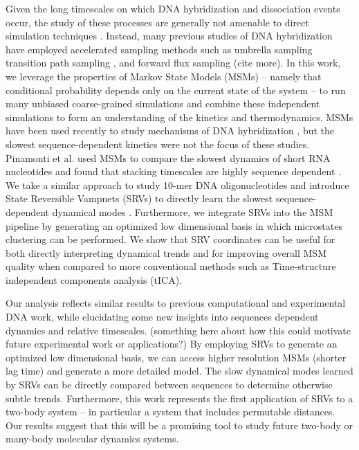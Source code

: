 \documentclass[journal=jpcbfk,manuscript=article]{achemso}
\begin{document}
Given the long timescales on which DNA hybridization and dissociation events occur, the study of these processes are generally not amenable to direct simulation techniques \citep{Phys2014}. Instead, many previous studies of DNA hybridization have employed accelerated sampling methods such as umbrella sampling \citep{Schmitt2013ExploringSurface} transition path sampling \citep{Sambriski2009}, \citep{Hoefert2011MolecularOligonucleotides}  and forward flux sampling  \citep{Phys2014} (cite more). In this work, we leverage the properties of Markov State Models (MSMs) -- namely that conditional probability depends only on the current state of the system \citep{Pande2010EverythingAsk}--  to run many unbiased coarse-grained simulations and combine these independent simulations to form an understanding of the kinetics and thermodynamics. MSMs have been used recently to study mechanisms of DNA hybridization  \citep{Jin2019} \citep{Xiao2019}, but the slowest sequence-dependent kinetics were not the focus of these studies. Pinamonti et al. used MSMs to compare the slowest dynamics of short RNA nucleotides and found that stacking timescales are highly sequence dependent \citep{Pinamonti2017}. We take a similar approach to study 10-mer DNA oligonucleotides and introduce State Reversible Vampnets (SRVs) to directly learn the slowest sequence-dependent dynamical modes \citep{Chen}. Furthermore, we integrate SRVs into the MSM pipeline by generating an optimized low dimensional basis in which microstates clustering can be performed. We show that SRV coordinates can be useful for both directly interpreting dynamical trends and for improving overall MSM quality when compared to more conventional methods such as Time-structure independent components analysis (tICA).

Our analysis reflects similar results to previous computational and experimental DNA work, while elucidating some new insights into sequences dependent dynamics and relative timescales. (something here about how this could motivate future experimental work or applications?) By employing SRVs to generate an optimized low dimensional basis, we can access higher resolution MSMs (shorter lag time) and generate a more detailed model. The slow dynamical modes learned by SRVs can be directly compared between sequences to determine otherwise subtle trends. Furthermore, this work represents the first application of SRVs to a two-body system -- in particular a system that includes permutable distances. Our results suggest that this will be a promising tool to study future two-body or many-body molecular dynamics systems.
\end{document}
